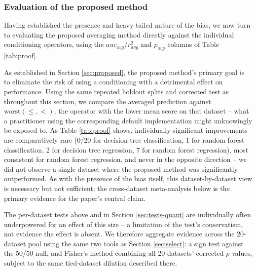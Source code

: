 \documentclass[5p,twocolumn,authoryear]{elsarticle}
\theoremstyle{plain}%
\theoremstyle{remark}%
\theoremstyle{definition}%
\begin{document}
\begin{table}[tbp]
  \caption{Hit-rate diagnostic for the nested-CV operator-selection procedure of Section \ref{sec:tests-model}: restricted to splits where $\leq$ and $<$ genuinely differ on the held-out test portion, how often does the selected operator match the one that turns out better? $n$ datasets counts how many of the 20 datasets in the pool had at least 2 such splits (needed to compute a meaningful rate).}
  \label{tab:hitrate}
  \centering
    \begin{scriptsize}
      
    \end{scriptsize}
\end{table}


\subsubsection{Evaluation of the proposed method}
\label{sec:tests-proposed}

Having established the presence and heavy-tailed nature of the bias, we now turn to evaluating the proposed averaging method directly against the individual conditioning operators, using the $auc_{avg}$/$r^2_{avg}$ and $p_{avg}$ columns of Table \ref{tab:proof}.

As established in Section \ref{sec:proposed}, the proposed method's primary goal is to eliminate the risk of using a conditioning with a detrimental effect on performance. Using the same repeated holdout splits and corrected test as throughout this section, we compare the averaged prediction against $\text{worst}(\leq,<)$, the operator with the lower mean score on that dataset -- what a practitioner using the corresponding default implementation might unknowingly be exposed to. As Table \ref{tab:proof} shows, individually significant improvements are comparatively rare (0/20 for decision tree classification, 1 for random forest classification, 2 for decision tree regression, 7 for random forest regression), most consistent for random forest regression, and never in the opposite direction -- we did not observe a single dataset where the proposed method was significantly outperformed. As with the presence of the bias itself, this dataset-by-dataset view is necessary but not sufficient; the cross-dataset meta-analysis below is the primary evidence for the paper's central claim.

\label{sec:meta}
The per-dataset tests above and in Section \ref{sec:tests-quant} are individually often underpowered for an effect of this size -- a limitation of the test's conservatism, not evidence the effect is absent. We therefore aggregate evidence across the 20-dataset pool using the same two tools as Section \ref{sec:select}: a sign test against the 50/50 null, and Fisher's method combining all 20 datasets' corrected $p$-values, subject to the same tied-dataset dilution described there.
\end{document}
